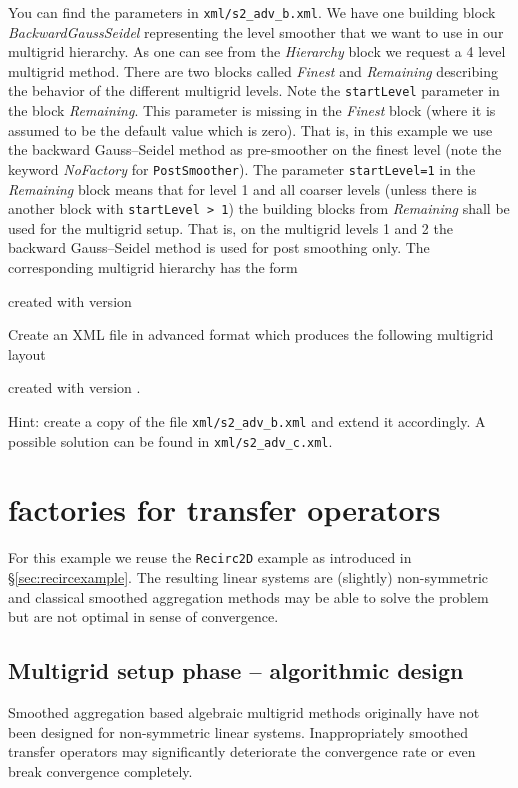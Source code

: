 \documentclass[10pt,fleqn]{book}
\newcommand\printScreenOutput[1]{

{\vspace{-0.3cm}\hfill\tiny{created with \muelu version }}
}
\begin{document}
You can find the parameters in \texttt{xml/s2\_adv\_b.xml}. We have one building block \textit{BackwardGaussSeidel} representing the level smoother that we want to use in our multigrid hierarchy. As one can see from the \textit{Hierarchy} block we request a 4 level multigrid method. There are two blocks called \textit{Finest} and \textit{Remaining} describing the behavior of the different multigrid levels. Note the \texttt{startLevel} parameter in the block \textit{Remaining}. This parameter is missing in the \textit{Finest} block (where it is assumed to be the default value which is zero). That is, in this example we use the backward Gauss--Seidel method as pre-smoother on the finest level (note the keyword \textit{NoFactory} for \texttt{PostSmoother}). The parameter \texttt{startLevel=1} in the \textit{Remaining} block means that for level 1 and all coarser levels (unless there is another block with \texttt{startLevel > 1}) the building blocks from \textit{Remaining} shall be used for the multigrid setup. That is, on the multigrid levels 1 and 2 the backward Gauss--Seidel method is used for post smoothing only. The corresponding multigrid hierarchy has the form
\printScreenOutput{s2_adv_b.txt_3.fragment_3.fragment}

\begin{exercise}
  Create an XML file in advanced format which produces the following multigrid layout
  \printScreenOutput{s2_adv_c.txt_3.fragment_3.fragment}.

  Hint: create a copy of the file \texttt{xml/s2\_adv\_b.xml} and extend it accordingly. A possible solution can be found in \texttt{xml/s2\_adv\_c.xml}.
\end{exercise}


\chapter{\muelu factories for transfer operators}

For this example we reuse the \verb|Recirc2D| example as introduced in \S\ref{sec:recircexample}. The resulting linear systems are (slightly) non-symmetric and classical smoothed aggregation methods may be able to solve the problem but are not optimal in sense of convergence.

\section{Multigrid setup phase -- algorithmic design}

Smoothed aggregation based algebraic multigrid methods originally have not been designed for non-symmetric linear systems. Inappropriately smoothed transfer operators may significantly deteriorate the convergence rate or even break convergence completely.
\end{document}
